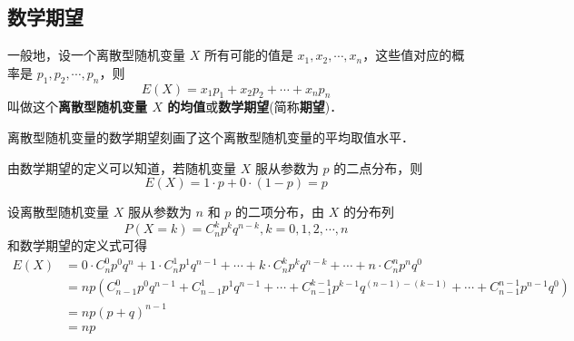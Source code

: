 
\begin{issues}
\issueDraft
\end{issues}

\subsection{数学期望}
一般地，设一个离散型随机变量 $X$ 所有可能的值是 $x_1,x_2,\cdots,x_n$，这些值对应的概率是 $p_1,p_2,\cdots,p_n$，则
\begin{equation}
E(X) = x_1p_1 + x_2p_2 + \cdots + x_np_n
\end{equation}
叫做这个\textbf{离散型随机变量 $X$ 的均值}或\textbf{数学期望}(简称\textbf{期望})．

离散型随机变量的数学期望刻画了这个离散型随机变量的平均取值水平．

由数学期望的定义可以知道，若随机变量 $X$ 服从参数为 $p$ 的二点分布，则
\begin{equation}
E(X) = 1 \cdot p + 0 \cdot(1 - p) = p
\end{equation}

设离散型随机变量 $X$ 服从参数为 $n$ 和 $p$ 的二项分布，由 $X$ 的分布列
\begin{equation}
P(X = k) = C_n^kp^kq^{n-k},k=0,1,2,\cdots ,n
\end{equation}
和数学期望的定义式可得
\begin{equation}
\begin{aligned}
E(X) &= 0\cdot C_n^0p^0q^n+1\cdot C_n^1p^1q^{n-1}+\cdots +k\cdot C_n^kp^kq^{n-k}+\cdots +n\cdot C_n^np^nq^0 \\
&= np(C_{n-1}^0p^0q^{n-1}+C_{n-1}^1p^1q^{n-1}+\cdots +C_{n-1}^{k-1}p^{k-1}q^{(n-1)-(k-1)}+\cdots+C_{n-1}^{n-1}p^{n-1}q^0) \\
&= np(p+q)^{n-1} \\
&= np
\end{aligned}
\end{equation}